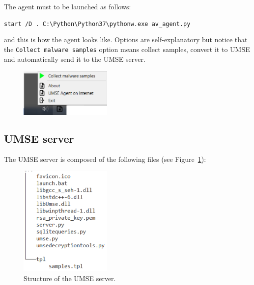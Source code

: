The agent must to be launched as follows:
\begin{tcolorbox}
  \verb|start /D . C:\Python\Python37\pythonw.exe av_agent.py|
\end{tcolorbox}

\noindent and this is how the agent looks like. Options are self-explanatory
but notice that the \texttt{Collect malware samples} option means collect
samples, convert it to UMSE and automatically send it to the UMSE server.
\begin{figure}[h]
  \centering
  \includegraphics[width=0.4\textwidth]{./figures/UMSEAgent}
\end{figure}

\subsection{UMSE server}

The UMSE server is composed of the following files (see
Figure~\ref{fig:UMSEServer}):
\begin{figure}
  \centering
  \includegraphics[width=0.4\textwidth]{./figures/UMSEServer}
  \caption{\label{fig:UMSEServer} Structure of the UMSE server.}
\end{figure}

